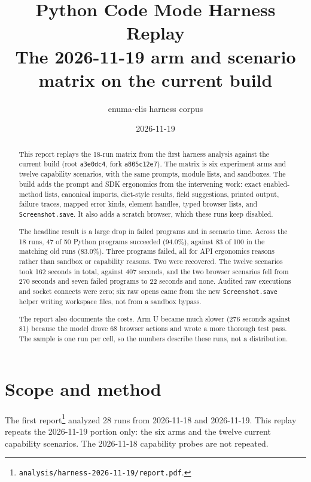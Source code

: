 \documentclass[11pt]{article}
\title{\bfseries Python Code Mode Harness Replay\\
\large The 2026-11-19 arm and scenario matrix on the current build}
\author{enuma-elis harness corpus}
\date{2026-11-19}
\newcommand{\code}[1]{\texttt{#1}}
\begin{document}
\maketitle

\begin{abstract}
This report replays the 18-run matrix from the first harness analysis against
the current build (root \code{a3e0dc4}, fork \code{a805c12e7}). The matrix is six
experiment arms and twelve capability scenarios, with the same prompts, module
lists, and sandboxes. The build adds the prompt and SDK ergonomics from the
intervening work: exact enabled-method lists, canonical imports, dict-style
results, field suggestions, printed output, failure traces, mapped error kinds,
element handles, typed browser lists, and \code{Screenshot.save}. It also adds a
scratch browser, which these runs keep disabled.

The headline result is a large drop in failed programs and in scenario time.
Across the 18 runs, 47 of 50 Python programs succeeded (94.0\%), against 83 of
100 in the matching old runs (83.0\%). Three programs failed, all for API
ergonomics reasons rather than sandbox or capability reasons. Two were
recovered. The twelve scenarios took 162 seconds in total, against 407 seconds,
and the two browser scenarios fell from 270 seconds and seven failed programs to
22 seconds and none. Audited raw executions and socket connects were zero; six
raw opens came from the new \code{Screenshot.save} helper writing workspace
files, not from a sandbox bypass.

The report also documents the costs. Arm U became much slower (276 seconds
against 81) because the model drove 68 browser actions and wrote a more
thorough test pass. The sample is one run per cell, so the numbers describe
these runs, not a distribution.
\end{abstract}

\tableofcontents
\newpage

\section{Scope and method}

The first report\footnote{\code{analysis/harness-2026-11-19/report.pdf}.}
analyzed 28 runs from 2026-11-18 and 2026-11-19. This replay repeats the
2026-11-19 portion only: the six arms and the twelve current capability
scenarios. The 2026-11-18 capability probes are not repeated.
\end{document}
